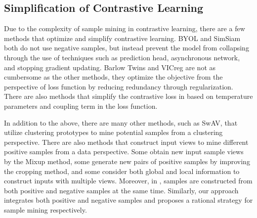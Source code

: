 \documentclass[review]{elsarticle}
\begin{document}
 \subsection{Simplification of Contrastive Learning}
Due to the complexity of sample mining in contrastive learning, there are a few methods that optimize and simplify contrastive learning. BYOL\cite{b6} and SimSiam \cite{b7} both do not use negative samples, but instead prevent the model from collapsing through the use of techniques such as prediction head, asynchronous network, and stopping gradient updating. Barlow Twins\cite{b8} and VICreg\cite{b9} are not as cumbersome as the other methods, they optimize the objective from the perspective of loss function by reducing redundancy through regularization. There are also methods that simplify the contrastive loss in based on temperature parameters and coupling term in the loss function\cite{b10,b11}.

In addition to the above, there are many other methods, such as SwAV\cite{b22}, that utilize clustering prototypes to mine potential samples from a clustering perspective. There are also methods that construct input views to mine different positive samples from a data perspective. Some obtain new input sample views by the Mixup method\cite{b23}, some generate new pairs of positive samples by improving the cropping method\cite{b31}, and some consider both global and local information to construct inputs with multiple views\cite{b32}. Moreover, in \cite{b24},  samples are constructed  from both positive and negative samples at the same time. Similarly, our approach integrates both positive and negative samples and proposes a rational strategy for sample mining respectively.

\end{document}
